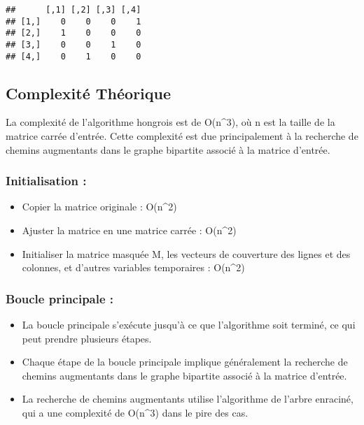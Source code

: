 \documentclass[
]{article}
\providecommand{\tightlist}{%
  \setlength{\itemsep}{0pt}\setlength{\parskip}{0pt}}
\begin{document}
\begin{verbatim}
##      [,1] [,2] [,3] [,4]
## [1,]    0    0    0    1
## [2,]    1    0    0    0
## [3,]    0    0    1    0
## [4,]    0    1    0    0
\end{verbatim}

\hypertarget{complexituxe9-thuxe9orique-1}{%
\subsection{Complexité Théorique}\label{complexituxe9-thuxe9orique-1}}

La complexité de l'algorithme hongrois est de O(n\^{}3), où n est la
taille de la matrice carrée d'entrée. Cette complexité est due
principalement à la recherche de chemins augmentants dans le graphe
bipartite associé à la matrice d'entrée.

\hypertarget{initialisation-1}{%
\subsubsection{Initialisation :}\label{initialisation-1}}

\begin{itemize}
\tightlist
\item
  Copier la matrice originale : O(n\^{}2)
\item
  Ajuster la matrice en une matrice carrée : O(n\^{}2)
\item
  Initialiser la matrice masquée M, les vecteurs de couverture des
  lignes et des colonnes, et d'autres variables temporaires : O(n\^{}2)
\end{itemize}

\hypertarget{boucle-principale}{%
\subsubsection{Boucle principale :}\label{boucle-principale}}

\begin{itemize}
\tightlist
\item
  La boucle principale s'exécute jusqu'à ce que l'algorithme soit
  terminé, ce qui peut prendre plusieurs étapes.
\item
  Chaque étape de la boucle principale implique généralement la
  recherche de chemins augmentants dans le graphe bipartite associé à la
  matrice d'entrée.
\item
  La recherche de chemins augmentants utilise l'algorithme de l'arbre
  enraciné, qui a une complexité de O(n\^{}3) dans le pire des cas.
\end{itemize}
\end{document}
